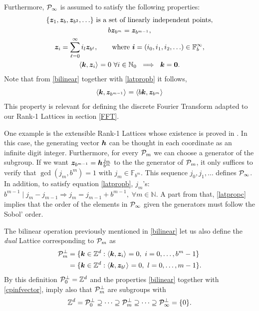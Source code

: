 \documentclass[graybox]{svmult}
\newcommand{\Z}{\mathbb{Z}} %
\newcommand{\N}{\mathbb{N}} %
\newcommand{\F}{\mathbb{F}} %
\newcommand{\bszero}{\boldsymbol{0}} %
\newcommand{\bsz}{\boldsymbol{z}}    %
\begin{document}
Furthermore, $\mathcal{P}_\infty$ is assumed to satisfy the following properties:
\begin{subequations} \label{cpinfvector}
\begin{gather}
\{\bsz_{1}, \bsz_{b}, \bsz_{b^2}, \ldots\} \text{ is a set of linearly independent points}, \\
b\bsz_{b^m}=\bsz_{b^{m-1}},\label{latpropb}\\
\bsz_i = \sum_{\ell=0}^{\infty} i_l \bsz_{b^\ell}, \qquad \text{where }\bsi=(i_0, i_1, i_2, \ldots ) \in \F_b^\infty, \label{latpropc}\\
\ip{\bsk}{\bsz_i} =  0 \ \forall i \in \N_0   \ \implies \ \bsk=\bszero. \label{latpropd}
\end{gather}
\end{subequations}
Note that from \eqref{bilinear} together with \eqref{latpropb} it follows,
\begin{equation}\label{assumgenip}
\ip{\bsk}{\bsz_{b^{m-1}}}=\ip{b\bsk}{\bsz_{b^m}}
\end{equation}
This property is relevant for defining the discrete Fourier Transform adapted to our Rank-1 Lattices in section \ref{FFT}.

One example is the extensible Rank-1 Lattices whose existence is proved in \cite{HicNie03a}. In this case, the generating vector $\boldsymbol{h}$ can be thought in each coordinate as an infinite digit integer. Furthermore, for every $\mathcal{P}_m$ we can choose a generator of the subgroup. If we want $\bsz_{b^{m-1}}=\bsh\frac{j_m}{b^m}$ to the the generator of $\mathcal{P}_m$, it only suffices to verify that $\gcd(j_m,b^m)=1$ with $j_m\in\F_{b^m}$. This sequence $j_0,j_1,\dots$ defines $\mathcal{P}_\infty$. In addition, to satisfy equation \eqref{latpropb},  $j_m$'s: $ b^{m-1} \mid j_m-j_{m-1}\Rightarrow j_m=j_{m-1}+b^{m-1},\;\forall m\in\N$. A part from that, \eqref{latpropc} implies that the order of the elements in $\mathcal{P}_\infty$ given the generators must follow the Sobol' order.

The bilinear operation previously mentioned in \eqref{bilinear} let us also define the \emph{dual} Lattice corresponding to $\mathcal{P}_m$ as
\begin{align}
\nonumber
\cp^{\perp}_m &= \{\bsk \in \Z^d : \ip{\bsk}{\bsz_i} = 0, \ i=0, \ldots, b^m-1\} \\
&= \{\bsk \in \Z^d : \ip{\bsk}{\bsz_{b^{l}}} = 0, \ l=0, \ldots, m-1\}.\label{dualdef}
\end{align}
By this definition $\cp^{\perp}_{0}=\Z^d$ and the properties \eqref{bilinear} together with \eqref{cpinfvector}, imply also that $\mathcal{P}^{\perp}_m$ are subgroups with
\begin{equation}\label{dualemb}
\Z^d=\cp^{\perp}_{0}\supseteq\dots\supseteq\cp^{\perp}_{m}\supseteq\dots\supseteq\cp^{\perp}_{\infty}=\{0\}.
\end{equation}
\end{document}
